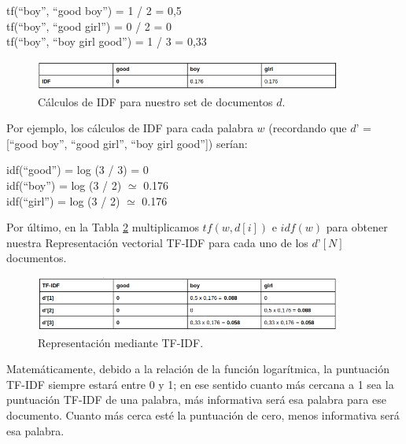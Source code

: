 \documentclass[12pt,a4paper]{article}
\begin{document}
\begin{sloppypar}
\begin{center}
tf(“boy”, “good boy”) = 1 / 2 = 0,5  \\
tf(“boy”, “good girl”) = 0 / 2 = 0  \\
tf(“boy”, “boy girl good”) = 1 / 3 = 0,33  \\
\end{center}

\begin{figure}[H]    
 \centering
 \includegraphics[width=0.9\textwidth]{images/NLP/10.png}
 \caption{Cálculos de IDF para nuestro set de documentos $d$\cite{NLP_2}.}
 \label{fig:Imagen_NLP_10}
\end{figure}

Por ejemplo, los cálculos de IDF para cada palabra $w$ (recordando que $d’$ = [“good boy”, “good girl”, “boy girl good”]) serían:

\begin{center}
idf(“good”) = log (3 / 3) = 0  \\
idf(“boy”) = log (3 / 2) $\simeq$ 0.176  \\
idf(“girl”) = log (3 / 2) $\simeq$ 0.176  \\
\end{center}

Por último, en la Tabla \ref{fig:Imagen_NLP_11} multiplicamos $tf (w,d[i])$ e $idf(w)$ para obtener nuestra Representación vectorial TF-IDF para cada uno de los $d’[N]$ documentos.

\begin{figure}[H]    
 \centering
 \includegraphics[width=0.9\textwidth]{images/NLP/11.png}
 \caption{Representación mediante TF-IDF\cite{NLP_2}.}
 \label{fig:Imagen_NLP_11}
\end{figure}

Matemáticamente, debido a la relación de la función logarítmica, la puntuación TF-IDF siempre estará entre 0 y 1; en ese sentido cuanto más cercana a 1 sea la puntuación TF-IDF de una palabra, más informativa será esa palabra para ese documento. Cuanto más cerca esté la puntuación de cero, menos informativa será esa palabra\cite{NLP_7}.


\end{sloppypar}
\end{document}

